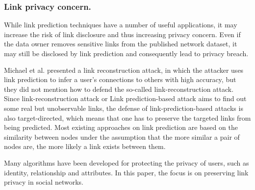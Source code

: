 \subsubsection{Link privacy concern.}


While link prediction techniques have a number of useful applications, it may increase the risk of link disclosure and thus increasing privacy concern. Even if the data owner removes sensitive links from the published network dataset, it may still be disclosed by link prediction and consequently lead to privacy breach. 

Michael et al. \cite{fire2013links} presented a link reconstruction attack, in which the attacker uses link prediction to infer a user's connections to others with high accuracy, but they did not mention how to defend the so-called link-reconstruction attack. Since link-reconstruction attack or Link prediction-based attack aims to find out some real but unobservable links, the defense of link-prediction-based attacks is also target-directed, which means that one has to preserve the targeted links from being predicted. Most existing approaches on link prediction are based on the similarity between nodes under the assumption that the more similar a pair of nodes are, the more likely a link exists between them.

Many algorithms have been developed for protecting the privacy of users, such as identity, relationship and attributes. In this paper, the focus is on preserving link privacy in social networks.


